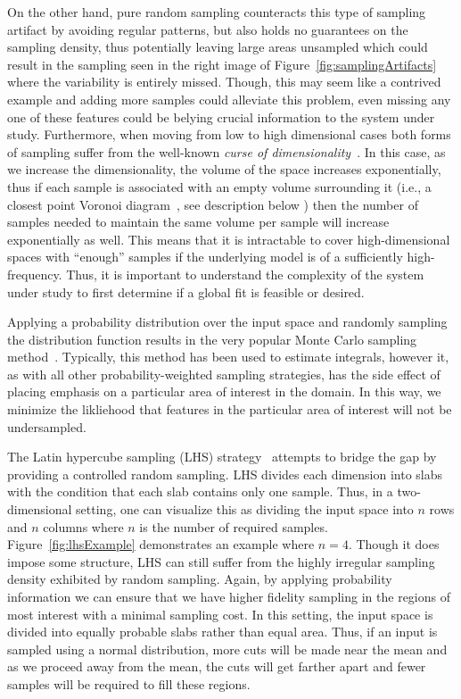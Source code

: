 On the other hand, pure random sampling counteracts this type of sampling artifact by avoiding regular patterns, but also holds no guarantees on the sampling density, thus potentially leaving large areas unsampled which could result in the sampling seen in the right image of Figure~\ref{fig:samplingArtifacts} where the variability is entirely missed.
%
Though, this may seem like a contrived example and adding more samples could alleviate this problem, even missing any one of these features could be belying crucial information to the system under study.
%
Furthermore, when moving from low to high dimensional cases both forms of sampling suffer from the well-known \emph{curse of dimensionality}~\cite{KeoghMueen2010}.
%
In this case, as we increase the dimensionality, the volume of the space increases exponentially, thus if each sample is associated with an empty volume surrounding it (i.e., a closest point Voronoi diagram~\cite{deBergCheongKreveld2008}, see description below ) then the number of samples needed to maintain the same volume per sample will increase exponentially as well.
%
This means that it is intractable to cover high-dimensional spaces with ``enough'' samples if the underlying model is of a sufficiently high-frequency.
%
Thus, it is important to understand the complexity of the system under study to first determine if a global fit is feasible or desired.

Applying a probability distribution over the input space and randomly sampling the distribution function results in the very popular Monte Carlo sampling method~\cite{MetropolisUlam1949}.
%
Typically, this method has been used to estimate integrals, however it, as with all other probability-weighted sampling strategies, has the side effect of placing emphasis on a particular area of interest in the domain.
%
In this way, we minimize the likliehood that features in the particular area of interest will not be undersampled.

The Latin hypercube sampling (LHS) strategy~\cite{McKayBeckmanConover1979, Tang1993,VanDam2008} attempts to bridge the gap by providing a controlled random sampling.
%
LHS divides each dimension into slabs with the condition that each slab contains only one sample.
%
Thus, in a two-dimensional setting, one can visualize this as dividing the input space into $n$ rows and $n$ columns where $n$ is the number of required samples.
%
Figure~\ref{fig:lhsExample} demonstrates an example where $n=4$.
%
Though it does impose some structure, LHS can still suffer from the highly irregular sampling density exhibited by random sampling.
%
Again, by applying probability information we can ensure that we have higher fidelity sampling in the regions of most interest with a minimal sampling cost.
%
In this setting, the input space is divided into equally probable slabs rather than equal area.
%
Thus, if an input is sampled using a normal distribution, more cuts will be made near the mean and as we proceed away from the mean, the cuts will get farther apart and fewer samples will be required to fill these regions.

